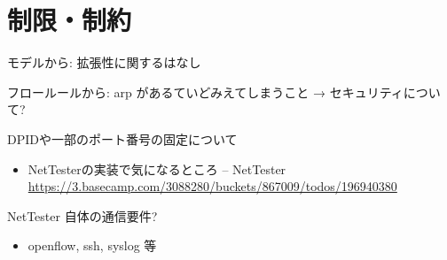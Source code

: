 \section{制限・制約}

モデルから: 拡張性に関するはなし

フロールールから: arp があるていどみえてしまうこと → セキュリティについて?

DPIDや一部のポート番号の固定について
\begin{itemize}
 \item NetTesterの実装で気になるところ – NetTester \url{https://3.basecamp.com/3088280/buckets/867009/todos/196940380}
\end{itemize}

NetTester 自体の通信要件?
\begin{itemize}
 \item openflow, ssh, syslog 等
\end{itemize}


